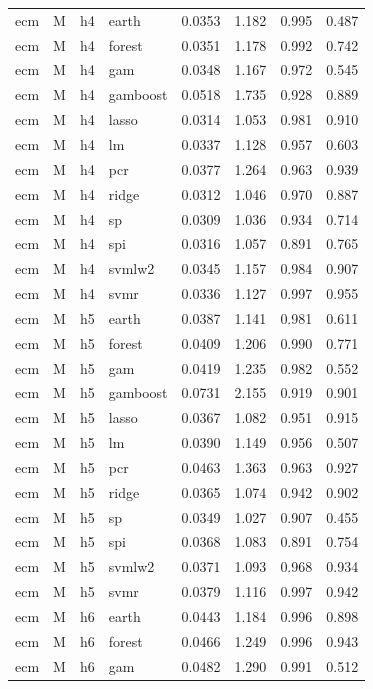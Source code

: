 \begin{ThreePartTable}
\begin{longtable}[t]{llclcccc}
\addlinespace
ecm & M & h4 & earth & 0.0353 & 1.182 & 0.995 & 0.487\\
ecm & M & h4 & forest & 0.0351 & 1.178 & 0.992 & 0.742\\
ecm & M & h4 & gam & 0.0348 & 1.167 & 0.972 & 0.545\\
ecm & M & h4 & gamboost & 0.0518 & 1.735 & 0.928 & 0.889\\
ecm & M & h4 & lasso & 0.0314 & 1.053 & 0.981 & 0.910\\
ecm & M & h4 & lm & 0.0337 & 1.128 & 0.957 & 0.603\\
ecm & M & h4 & pcr & 0.0377 & 1.264 & 0.963 & 0.939\\
ecm & M & h4 & ridge & 0.0312 & 1.046 & 0.970 & 0.887\\
ecm & M & h4 & sp & 0.0309 & 1.036 & 0.934 & 0.714\\
ecm & M & h4 & spi & 0.0316 & 1.057 & 0.891 & 0.765\\
ecm & M & h4 & svmlw2 & 0.0345 & 1.157 & 0.984 & 0.907\\
ecm & M & h4 & svmr & 0.0336 & 1.127 & 0.997 & 0.955\\
\addlinespace
ecm & M & h5 & earth & 0.0387 & 1.141 & 0.981 & 0.611\\
ecm & M & h5 & forest & 0.0409 & 1.206 & 0.990 & 0.771\\
ecm & M & h5 & gam & 0.0419 & 1.235 & 0.982 & 0.552\\
ecm & M & h5 & gamboost & 0.0731 & 2.155 & 0.919 & 0.901\\
ecm & M & h5 & lasso & 0.0367 & 1.082 & 0.951 & 0.915\\
ecm & M & h5 & lm & 0.0390 & 1.149 & 0.956 & 0.507\\
ecm & M & h5 & pcr & 0.0463 & 1.363 & 0.963 & 0.927\\
ecm & M & h5 & ridge & 0.0365 & 1.074 & 0.942 & 0.902\\
ecm & M & h5 & sp & 0.0349 & 1.027 & 0.907 & 0.455\\
ecm & M & h5 & spi & 0.0368 & 1.083 & 0.891 & 0.754\\
ecm & M & h5 & svmlw2 & 0.0371 & 1.093 & 0.968 & 0.934\\
ecm & M & h5 & svmr & 0.0379 & 1.116 & 0.997 & 0.942\\
\addlinespace
ecm & M & h6 & earth & 0.0443 & 1.184 & 0.996 & 0.898\\
ecm & M & h6 & forest & 0.0466 & 1.249 & 0.996 & 0.943\\
ecm & M & h6 & gam & 0.0482 & 1.290 & 0.991 & 0.512\\

\end{longtable}
\end{ThreePartTable}
